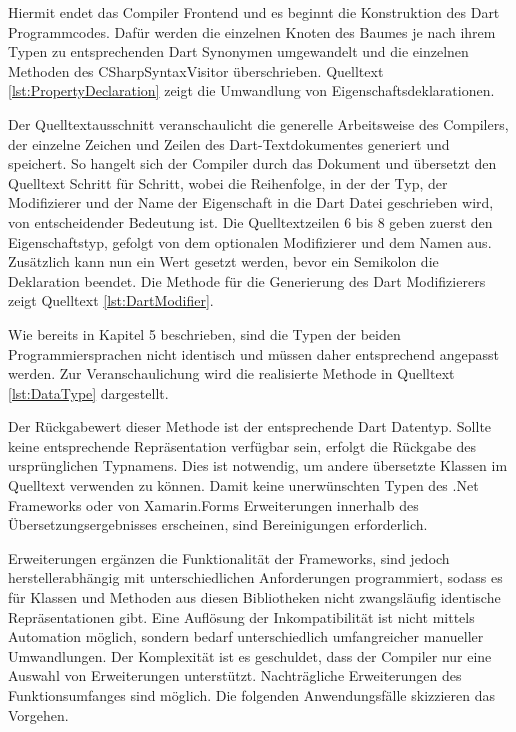 Hiermit endet das Compiler Frontend und es beginnt die Konstruktion des Dart Programmcodes.  Dafür werden die einzelnen Knoten des Baumes je nach ihrem Typen zu entsprechenden Dart Synonymen umgewandelt und die einzelnen Methoden des \glq CSharpSyntaxVisitor\grq{} überschrieben.  Quelltext \ref{lst:PropertyDeclaration} zeigt die Umwandlung von Eigenschaftsdeklarationen.
\newpage


Der Quelltextausschnitt veranschaulicht die generelle Arbeitsweise des Compilers,  der einzelne Zeichen und Zeilen des Dart-Textdokumentes generiert und speichert.  So hangelt sich der Compiler durch das Dokument und übersetzt den Quelltext Schritt für Schritt, wobei die Reihenfolge, in der der Typ, der Modifizierer und der Name der Eigenschaft in die Dart Datei geschrieben wird,  von entscheidender Bedeutung ist.  Die Quelltextzeilen 6 bis 8 geben zuerst den Eigenschaftstyp,  gefolgt von dem optionalen Modifizierer und dem Namen aus.  Zusätzlich kann nun ein Wert gesetzt werden,  bevor ein Semikolon die Deklaration beendet.  Die Methode für die Generierung des Dart Modifizierers zeigt Quelltext \ref{lst:DartModifier}.




Wie bereits in Kapitel 5 beschrieben,  sind die Typen der beiden Programmiersprachen nicht identisch und müssen daher entsprechend angepasst werden.  Zur Veranschaulichung wird die realisierte Methode in Quelltext \ref{lst:DataType} dargestellt. 


Der Rückgabewert dieser Methode ist der entsprechende Dart Datentyp.  Sollte keine entsprechende Repräsentation verfügbar sein,  erfolgt die Rückgabe des ursprünglichen Typnamens.  Dies ist notwendig,  um andere übersetzte Klassen im Quelltext verwenden zu können.  Damit keine unerwünschten Typen des .Net Frameworks oder von Xamarin.Forms Erweiterungen innerhalb des Übersetzungsergebnisses erscheinen, sind Bereinigungen erforderlich. 

Erweiterungen ergänzen die Funktionalität der Frameworks,  sind jedoch herstellerabhängig mit unterschiedlichen Anforderungen programmiert,  sodass es für Klassen und Methoden aus diesen Bibliotheken nicht zwangsläufig identische Repräsentationen gibt.  Eine Auflösung der Inkompatibilität ist nicht mittels Automation möglich, sondern bedarf unterschiedlich umfangreicher manueller Umwandlungen.  Der Komplexität ist es geschuldet,  dass der Compiler nur eine Auswahl von Erweiterungen unterstützt.  Nachträgliche Erweiterungen des Funktionsumfanges sind möglich.  Die folgenden Anwendungsfälle skizzieren das Vorgehen.  

